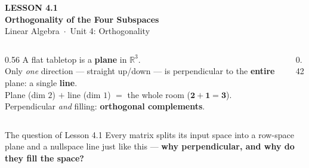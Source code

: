\documentclass[aspectratio=169, 11pt]{beamer}
\begin{document}
{
\begin{frame}[plain]
  \vspace{2.8cm}\hspace{0.55cm}%
  \begin{minipage}{0.9\textwidth}
    {\color{goldacc}\bfseries\small LESSON 4.1}\\[0.5cm]
    {\color{white}\bfseries\LARGE Orthogonality of the Four Subspaces}\\[1.0cm]
    {\color{blushmid}\small Linear Algebra~$\cdot$~Unit 4: Orthogonality}
  \end{minipage}
\end{frame}
}

\begin{frame}[t, plain]
  \begin{columns}[T]
    \begin{column}{0.56\textwidth}
      A flat tabletop is a \textbf{plane} in $\mathbb{R}^3$.\\[6pt]
      Only \emph{one} direction --- straight up/down --- is perpendicular to the \textbf{entire} plane:
      a single \textbf{line}.\\[8pt]
      Plane (dim $2$) $+$ line (dim $1$) $=$ the whole room ($\mathbf{2+1=3}$). Perpendicular \emph{and}
      filling: \textbf{orthogonal complements}.
    \end{column}
    \begin{column}{0.42\textwidth}
      \centering
    \end{column}
  \end{columns}
  \vspace{4pt}
  \begin{block}{The question of Lesson 4.1}
    Every matrix splits its input space into a row-space plane and a nullspace line just like this ---
    \textbf{why perpendicular, and why do they fill the space?}
  \end{block}
\end{frame}
\end{document}
